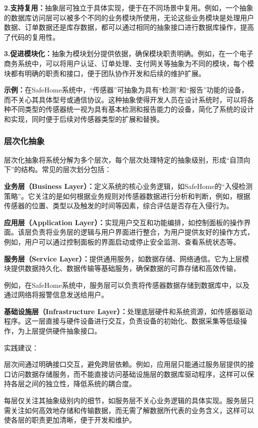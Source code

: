 \textbf{2.支持复用：}抽象层可独立于具体实现，便于在不同场景中复用。例如，一个抽象的数据库访问层可以被多个不同的业务模块所使用，无论这些业务模块是处理用户数据、订单数据还是库存数据，都可以通过相同的抽象接口进行数据库操作，提高了代码的复用性。

\textbf{3.促进模块化：}抽象为模块划分提供依据，确保模块职责明确。例如，在一个电子商务系统中，可以将用户认证、订单处理、支付网关等抽象为不同的模块，每个模块都有明确的职责和接口，便于团队协作开发和后续的维护扩展。

\textbf{示例：}在SafeHome系统中，``传感器''可抽象为具有``检测''和``报告''功能的设备，而不关心其具体型号或通信协议。这种抽象使得开发人员在设计系统时，可以将各种不同类型的传感器统一视为具有基本检测和报告能力的设备，简化了系统的设计和实现，同时便于后续对传感器类型的扩展和替换。

\subsubsection{层次化抽象}

层次化抽象将系统分解为多个层次，每个层次处理特定的抽象级别，形成``自顶向下''的结构。常见的层次划分包括：

\textbf{业务层（Business Layer）：}定义系统的核心业务逻辑，如SafeHome的``入侵检测策略''。它关注的是如何根据业务规则对传感器数据进行分析和判断，例如，根据传感器的位置、类型以及触发的时间等因素，综合评估是否存在入侵行为。

\textbf{应用层（Application Layer）：}实现用户交互和功能编排，如控制面板的操作界面。该层负责将业务层的逻辑与用户界面进行整合，为用户提供友好的操作方式，例如，用户可以通过控制面板的界面启动或停止安全监测、查看系统状态等。

\textbf{服务层（Service Layer）：}提供通用服务，如数据存储、网络通信。它为上层模块提供数据持久化、数据传输等基础服务，确保数据的可靠存储和高效传输，

例如，在SafeHome系统中，服务层可以负责将传感器数据存储到数据库中，以及通过网络将报警信息发送给用户。

\textbf{基础设施层（Infrastructure Layer）：}处理底层硬件和系统资源，如传感器驱动程序。这一层直接与硬件设备进行交互，负责设备的初始化、数据采集等低级操作，为上层提供硬件抽象接口。

实践建议：

层次间通过明确接口交互，避免跨层依赖。例如，应用层只能通过服务层提供的接口访问数据存储服务，而不能直接访问基础设施层的数据库驱动程序，这样可以保持各层之间的独立性，降低系统的耦合度。

每层仅关注其抽象级别内的细节，如服务层不关心业务逻辑的具体实现。服务层只需关注如何高效地存储和传输数据，而无需了解数据所代表的业务含义，这样可以使各层的职责更加清晰，便于开发和维护。

